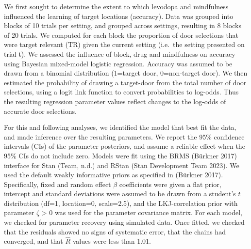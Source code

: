 \documentclass{article}
\begin{document}
We first sought to determine the extent to which levodopa and
mindfulness influenced the learning of target locations (accuracy). Data
was grouped into blocks of 10 trials per setting, and grouped across
settings, resulting in 8 blocks of 20 trials. We computed for each block
the proportion of door selections that were target relevant (TR) given
the current setting (i.e.~the setting presented on trial t). We assessed
the influence of block, drug and mindfulness on accuracy using Bayesian
mixed-model logistic regression. Accuracy was assumed to be drawn from a
binomial distribution (1=target door, 0=non-target door). We then
estimated the probability of drawing a target-door from the total number
of door selections, using a logit link function to convert probabilities
to log-odds. Thus the resulting regression parameter values reflect
changes to the log-odds of accurate door selections.

For this and following analyses, we identified the model that best fit
the data, and made inference over the resulting parameters. We report
the 95\% confidence intervals (CIs) of the parameter posteriors, and
assume a reliable effect when the 95\% CIs do not include zero. Models
were fit using the BRMS (Bürkner 2017) interface for Stan (Team, n.d.)
and RStan (Stan Development Team 2023). We used the default weakly
informative priors as specified in (Bürkner 2017). Specifically, fixed
and random effect \(\beta\) coefficients were given a flat prior,
intercept and standard deviations were assumed to be drawn from a
student's \(t\) distribution (df=1, location=0, scale=2.5), and the
LKJ-correlation prior with parameter \(\zeta\) \textgreater{} 0 was used
for the parameter covariance matrix. For each model, we checked for
parameter recovery using simulated data. Once fitted, we checked that
the residuals showed no signs of systematic error, that the chains had
converged, and that \(\hat{R}\) values were less than 1.01.
\end{document}

